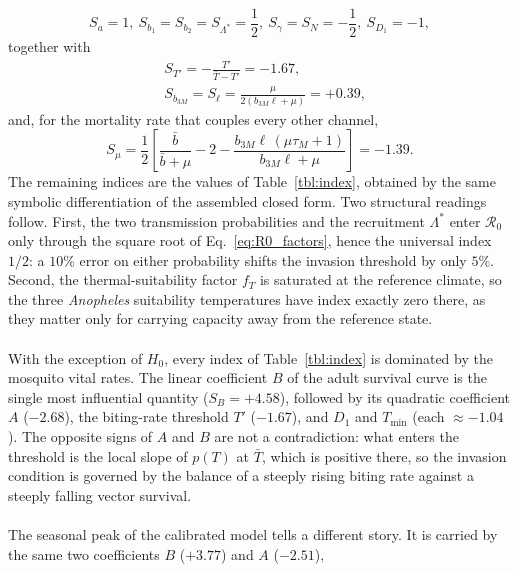 \documentclass[a4paper,fleqn]{cas-dc}
\begin{document}
\begin{equation}
S_a = 1, \ 
S_{b_1} = S_{b_2} = S_{\Lambda^*} = \frac{1}{2}, \ 
S_{\gamma} = S_{N} = -\frac{1}{2}, \ 
S_{D_1} = -1,
\end{equation}
together with
\begin{equation}\label{eq:index_identities}
\begin{aligned}
&S_{T'} = -\frac{T'}{\bar{T} - T'} = -1.67,\\
&S_{b_{3M}} = S_{\ell} = \frac{\mu}{2(b_{3M}\ell + \mu)} = +0.39,
\end{aligned}
\end{equation}
and, for the mortality rate that couples every other channel,
\begin{equation}
S_{\mu} = \frac{1}{2}\left[
\frac{\bar{b}}{\bar{b} + \mu} - 2
- \frac{b_{3M}\ell\,(\mu\tau_M + 1)}{b_{3M}\ell + \mu}\right] = -1.39.
\label{eq:index_mu}
\end{equation}
The remaining indices are the values of Table~\ref{tbl:index}, obtained by
the same symbolic differentiation of the assembled closed form. Two
structural readings follow. First, the two transmission probabilities and
the recruitment $\Lambda^*$ enter $\mathcal{R}_0$ only through the square
root of Eq.~\ref{eq:R0_factors}, hence the universal index $1/2$: a
$10\%$ error on either probability shifts the invasion threshold by only
$5\%$. Second, the thermal-suitability factor $f_T$ is saturated at the
reference climate, so the three \textit{Anopheles} suitability
temperatures have index exactly zero there, as they matter only for
carrying capacity away from the reference state.
\\\\
With the exception of $H_0$, every index of Table~\ref{tbl:index} is
dominated by the mosquito vital rates. The linear coefficient $B$ of the
adult survival curve is the single most influential quantity
($S_B = +4.58$), followed by its quadratic coefficient $A$ ($-2.68$),
the biting-rate threshold $T'$ ($-1.67$), and $D_1$ and $T_{\min}$
(each $\approx -1.04$). The opposite signs of $A$ and $B$ are not a
contradiction: what enters the threshold is the local slope of
$p(T)$ at $\bar{T}$, which is positive there, so the invasion
condition is governed by the balance of a steeply rising biting rate
against a steeply falling vector survival.
\\\\
The seasonal peak of the calibrated model tells a different story. It is
carried by the same two coefficients $B$ ($+3.77$) and $A$ ($-2.51$),
\end{document}
